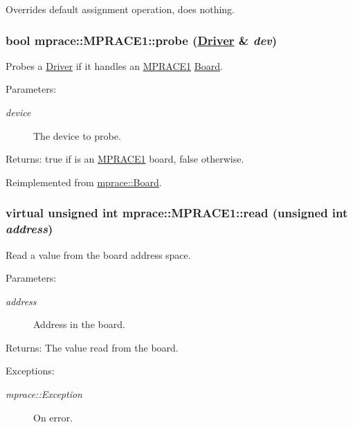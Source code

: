 Overrides default assignment operation, does nothing. 

\hypertarget{classmprace_1_1MPRACE1_e0}{
\subsubsection[probe]{\setlength{\rightskip}{0pt plus 5cm}bool mprace::MPRACE1::probe (\hyperlink{classmprace_1_1Driver}{Driver} \& {\em dev})}}
\label{classmprace_1_1MPRACE1_e0}


Probes a \hyperlink{classmprace_1_1Driver}{Driver} if it handles an \hyperlink{classmprace_1_1MPRACE1}{MPRACE1} \hyperlink{classmprace_1_1Board}{Board}. 

\begin{Desc}
\item[Parameters:]
\begin{description}
\item[{\em device}]The device to probe. \end{description}
\end{Desc}
\begin{Desc}
\item[Returns:]true if is an \hyperlink{classmprace_1_1MPRACE1}{MPRACE1} board, false otherwise.\end{Desc}


Reimplemented from \hyperlink{classmprace_1_1Board_e0}{mprace::Board}.\hypertarget{classmprace_1_1MPRACE1_a3}{
\subsubsection[read]{\setlength{\rightskip}{0pt plus 5cm}virtual unsigned int mprace::MPRACE1::read (unsigned int {\em address})}}
\label{classmprace_1_1MPRACE1_a3}


Read a value from the board address space. 

\begin{Desc}
\item[Parameters:]
\begin{description}
\item[{\em address}]Address in the board. \end{description}
\end{Desc}
\begin{Desc}
\item[Returns:]The value read from the board. \end{Desc}
\begin{Desc}
\item[Exceptions:]
\begin{description}
\item[{\em mprace::Exception}]On error.\end{description}
\end{Desc}


